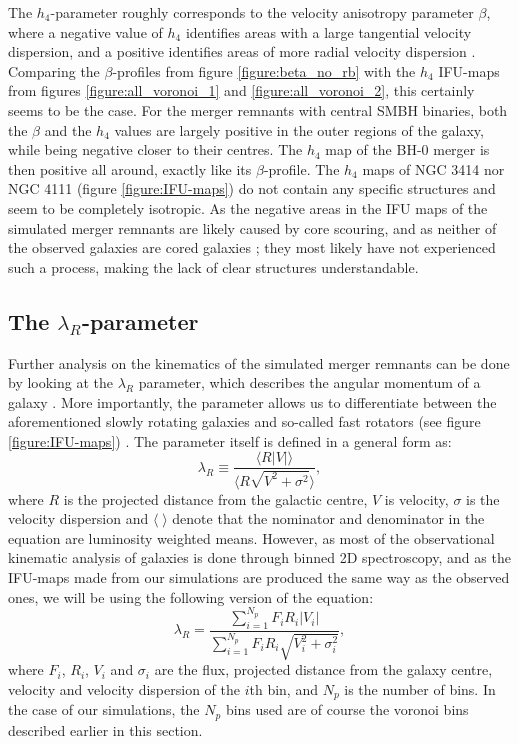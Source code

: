 \documentclass[english, oneside]{HYgradu}
\begin{document}
The $h_4$-parameter roughly corresponds to the velocity anisotropy parameter $\beta$, where a negative value of $h_4$ identifies areas with a large tangential velocity dispersion, and a positive identifies areas of more radial velocity dispersion \citep{Gerhard1993, Gerhard1998, Thomas2007}. Comparing the $\beta$-profiles from figure \ref{figure:beta_no_rb} with the $h_4$ IFU-maps from figures \ref{figure:all_voronoi_1} and \ref{figure:all_voronoi_2}, this certainly seems to be the case. For the merger remnants with central SMBH binaries, both the $\beta$ and the $h_4$ values are largely positive in the outer regions of the galaxy, while being negative closer to their centres. The $h_4$ map of the BH-0 merger is then positive all around, exactly like its $\beta$-profile. The $h_4$ maps of NGC 3414 nor NGC 4111 (figure \ref{figure:IFU-maps}) do not contain any specific structures and seem to be completely isotropic. As the negative areas in the IFU maps of the simulated merger remnants are likely caused by core scouring, and as neither of the observed galaxies are cored galaxies \citep{Lauer2007}; they most likely have not experienced such a process, making the lack of clear structures understandable.

\subsection{The $\lambda_R$-parameter}

Further analysis on the kinematics of the simulated merger remnants can be done by looking at the $\lambda_R$ parameter, which describes the angular momentum of a galaxy \citep{Emsellem2007}. More importantly, the parameter allows us to differentiate between the aforementioned slowly rotating galaxies and so-called fast rotators (see figure \ref{figure:IFU-maps}) \citep{Emsellem2007}. The parameter itself is defined in a general form as:
\begin{equation}
\lambda_R \equiv \frac{\langle R |V| \rangle}{\langle R \sqrt{V^2 + \sigma^2} \rangle}, \label{eq:general_lambdar}
\end{equation}
where $R$ is the projected distance from the galactic centre, $V$ is velocity, $\sigma$ is the velocity dispersion and $\langle \; \rangle$ denote that the nominator and denominator in the equation are luminosity weighted means. However, as most of the observational kinematic analysis of galaxies is done through binned 2D spectroscopy, and as the IFU-maps made from our simulations are produced the same way as the observed ones, we will be using the following version of the equation:
\begin{equation}
\lambda_R = \frac{\sum^{N_p}_{i=1} F_i R_i |V_i|}{\sum^{N_p}_{i=1} F_i R_i \sqrt{V_i^2 + \sigma^2_i}}, \label{eq:binned_lambdar}
\end{equation}
where $F_i$, $R_i$, $V_i$ and $\sigma_i$ are the flux, projected distance from the galaxy centre, velocity and velocity dispersion of the $i$th bin, and $N_p$ is the number of bins. In the case of our simulations, the $N_p$ bins used are of course the voronoi bins described earlier in this section. 
\end{document}
